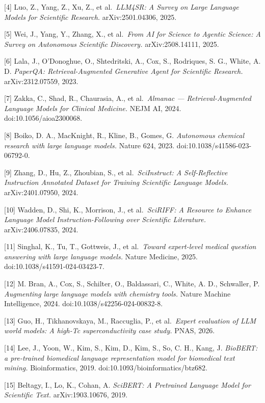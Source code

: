 {[}4{]} Luo, Z., Yang, Z., Xu, Z., et al.~\emph{LLM4SR: A Survey on Large Language Models for Scientific Research.} arXiv:2501.04306, 2025.

{[}5{]} Wei, J., Yang, Y., Zhang, X., et al.~\emph{From AI for Science to Agentic Science: A Survey on Autonomous Scientific Discovery.} arXiv:2508.14111, 2025.

{[}6{]} L\textquotesingle ala, J., O'Donoghue, O., Shtedritski, A., Cox, S., Rodriques, S. G., White, A. D. \emph{PaperQA: Retrieval-Augmented Generative Agent for Scientific Research.} arXiv:2312.07559, 2023.

{[}7{]} Zakka, C., Shad, R., Chaurasia, A., et al.~\emph{Almanac --- Retrieval-Augmented Language Models for Clinical Medicine.} NEJM AI, 2024. doi:10.1056/aioa2300068.

{[}8{]} Boiko, D. A., MacKnight, R., Kline, B., Gomes, G. \emph{Autonomous chemical research with large language models.} Nature 624, 2023. doi:10.1038/s41586-023-06792-0.

{[}9{]} Zhang, D., Hu, Z., Zhoubian, S., et al.~\emph{SciInstruct: A Self-Reflective Instruction Annotated Dataset for Training Scientific Language Models.} arXiv:2401.07950, 2024.

{[}10{]} Wadden, D., Shi, K., Morrison, J., et al.~\emph{SciRIFF: A Resource to Enhance Language Model Instruction-Following over Scientific Literature.} arXiv:2406.07835, 2024.

{[}11{]} Singhal, K., Tu, T., Gottweis, J., et al.~\emph{Toward expert-level medical question answering with large language models.} Nature Medicine, 2025. doi:10.1038/s41591-024-03423-7.

{[}12{]} M. Bran, A., Cox, S., Schilter, O., Baldassari, C., White, A. D., Schwaller, P. \emph{Augmenting large language models with chemistry tools.} Nature Machine Intelligence, 2024. doi:10.1038/s42256-024-00832-8.

{[}13{]} Guo, H., Tikhanovskaya, M., Raccuglia, P., et al.~\emph{Expert evaluation of LLM world models: A high-Tc superconductivity case study.} PNAS, 2026.

{[}14{]} Lee, J., Yoon, W., Kim, S., Kim, D., Kim, S., So, C. H., Kang, J. \emph{BioBERT: a pre-trained biomedical language representation model for biomedical text mining.} Bioinformatics, 2019. doi:10.1093/bioinformatics/btz682.

{[}15{]} Beltagy, I., Lo, K., Cohan, A. \emph{SciBERT: A Pretrained Language Model for Scientific Text.} arXiv:1903.10676, 2019.

